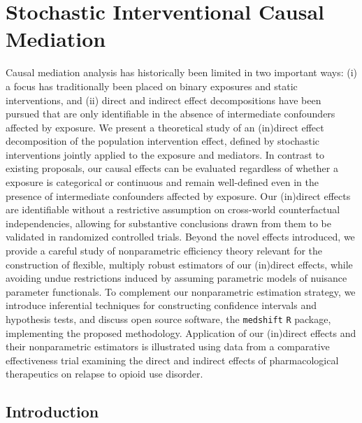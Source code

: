 \chapter{Stochastic Interventional Causal Mediation}\label{four}

Causal mediation analysis has historically been limited in two important ways:
(i) a focus has traditionally been placed on binary exposures and static
interventions, and (ii) direct and indirect effect decompositions have been
pursued that are only identifiable in the absence of intermediate confounders
affected by exposure. We present a theoretical study of an (in)direct effect
decomposition of the population intervention effect, defined by stochastic
interventions jointly applied to the exposure and mediators. In contrast to
existing proposals, our causal effects can be evaluated regardless of whether
a exposure is categorical or continuous and remain well-defined even in the
presence of intermediate confounders affected by exposure. Our (in)direct
effects are identifiable without a restrictive assumption on cross-world
counterfactual independencies, allowing for substantive conclusions drawn from
them to be validated in randomized controlled trials. Beyond the novel effects
introduced, we provide a careful study of nonparametric efficiency theory
relevant for the construction of flexible, multiply robust estimators of our
(in)direct effects, while avoiding undue restrictions induced by assuming
parametric models of nuisance parameter functionals. To complement our
nonparametric estimation strategy, we introduce inferential techniques for
constructing confidence intervals and hypothesis tests, and discuss open source
software, the \texttt{medshift} \texttt{R} package, implementing the proposed
methodology. Application of our (in)direct effects and their nonparametric
estimators is illustrated using data from a comparative effectiveness trial
examining the direct and indirect effects of pharmacological therapeutics on
relapse to opioid use disorder.

\section{Introduction}\label{sec:intro}

